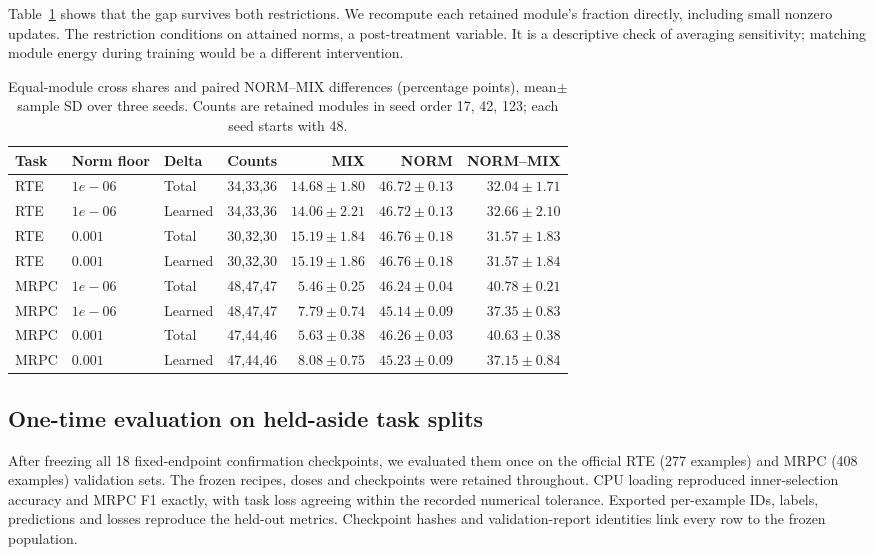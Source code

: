 \documentclass{article}
\begin{document}
Table~\ref{tab:reviewsensitivity} shows that the gap survives both restrictions. We recompute each retained module's fraction directly, including small nonzero updates. The restriction conditions on attained norms, a post-treatment variable. It is a descriptive check of averaging sensitivity; matching module energy during training would be a different intervention.

\begin{table}[t]
\centering
\caption{Equal-module cross shares and paired NORM--MIX differences (percentage points), mean$\pm$sample SD over three seeds. Counts are retained modules in seed order 17, 42, 123; each seed starts with 48.}
\label{tab:reviewsensitivity}
\begin{adjustbox}{max width=\linewidth}
\begin{tabular}{lllrrrr}
\toprule
Task & Norm floor & Delta & Counts & MIX & NORM & NORM--MIX\\
\midrule
RTE & $1e-06$ & Total & 34,33,36 & $14.68 \pm 1.80$ & $46.72 \pm 0.13$ & $32.04 \pm 1.71$ \\
RTE & $1e-06$ & Learned & 34,33,36 & $14.06 \pm 2.21$ & $46.72 \pm 0.13$ & $32.66 \pm 2.10$ \\
RTE & $0.001$ & Total & 30,32,30 & $15.19 \pm 1.84$ & $46.76 \pm 0.18$ & $31.57 \pm 1.83$ \\
RTE & $0.001$ & Learned & 30,32,30 & $15.19 \pm 1.86$ & $46.76 \pm 0.18$ & $31.57 \pm 1.84$ \\
MRPC & $1e-06$ & Total & 48,47,47 & $5.46 \pm 0.25$ & $46.24 \pm 0.04$ & $40.78 \pm 0.21$ \\
MRPC & $1e-06$ & Learned & 48,47,47 & $7.79 \pm 0.74$ & $45.14 \pm 0.09$ & $37.35 \pm 0.83$ \\
MRPC & $0.001$ & Total & 47,44,46 & $5.63 \pm 0.38$ & $46.26 \pm 0.03$ & $40.63 \pm 0.38$ \\
MRPC & $0.001$ & Learned & 47,44,46 & $8.08 \pm 0.75$ & $45.23 \pm 0.09$ & $37.15 \pm 0.84$ \\
\bottomrule
\end{tabular}
\end{adjustbox}
\end{table}

\subsection{One-time evaluation on held-aside task splits}
\label{app:heldaside}
After freezing all 18 fixed-endpoint confirmation checkpoints, we evaluated them once on the official RTE (277 examples) and MRPC (408 examples) validation sets. The frozen recipes, doses and checkpoints were retained throughout. CPU loading reproduced inner-selection accuracy and MRPC F1 exactly, with task loss agreeing within the recorded numerical tolerance. Exported per-example IDs, labels, predictions and losses reproduce the held-out metrics. Checkpoint hashes and validation-report identities link every row to the frozen population.
\end{document}
